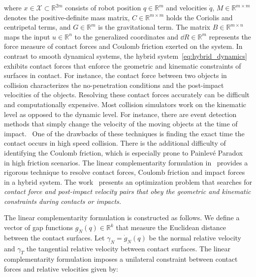 \noindent where $x \in \mathcal{X} \subset \mathbb{R}^{2m}$ consists of robot
position $q \in \mathbb{R}^m$ and velocities $\dot{q}$, $M \in \mathbb{R}^{m
\times m}$ denotes the positive-definite mass matrix, $C \in \mathbb{R}^{m
\times m}$ holds the Coriolis and centripetal terms, and $G \in \mathbb{R}^{m}$
is the gravitational term. The matrix $B \in \mathbb{R}^{m \times n}$ maps the
input $u \in \mathbb{R}^{n}$ to the generalized coordinates and $\dd R \in
\mathbb{R}^m$ represents the force measure of contact forces and Coulomb
friction exerted on the system. 
%
%
In contrast to smooth dynamical systems, the hybrid
system~\eqref{eq:hybrid_dynamics} exhibits contact forces that enforce
the geometric and kinematic constraints of surfaces in contact.
%
For instance, the contact force between two objects in collision characterizes
the no-penetration conditions and the post-impact velocities of the objects.
%
Resolving these contact forces accurately can be difficult and computationally
expensive.
%
Most collision simulators work on the kinematic level as opposed to the dynamic
level.
%
For instance, there are event detection methods that simply change the velocity
of the moving objects at the time of impact.~
%
One of the drawbacks of these techniques is finding the exact time the contact
occurs in high speed collision.
%
There is the additional difficulty of identifying the Coulomb friction, which is
especially prone to Painlev{{\'e}} Paradox~\cite{genot1999new} in high friction
scenarios.
%
The linear complementarity formulation in~\cite{glocker2005formulation} provides
a rigorous technique to resolve contact forces, Coulomb friction and impact
forces in a hybrid system.
%
The work~ presents an optimization problem that searches for \it{contact force
and post-impact velocity} \normalfont pairs that obey the geometric and
kinematic constraints during contacts or impacts.
%

%
The linear complementarity formulation is constructed as follows. We define a
vector of gap functions $g_N(q) \in \mathbb{R}^{k}$ that measure the
Euclidean distance~ between the contact surfaces. 
%
Let $\gamma_N = \dot{g}_N(q)$ be the normal relative velocity and
$\gamma_T$ the tangential relative velocity between contact surfaces.
%
The linear complementarity formulation imposes a unilateral constraint between
contact forces and relative velocities given by:

